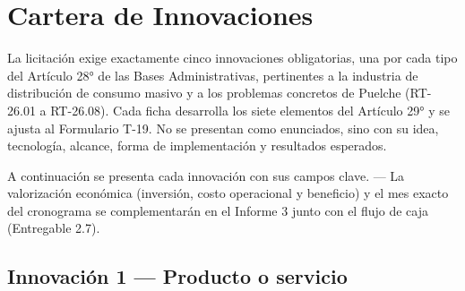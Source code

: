 \chapter{Cartera de Innovaciones}
\label{sec:innovaciones}

La licitación exige exactamente cinco innovaciones obligatorias, una por cada tipo del
Artículo 28° de las Bases Administrativas, pertinentes a la industria de distribución de
consumo masivo y a los problemas concretos de Puelche (RT-26.01 a RT-26.08). Cada ficha
desarrolla los siete elementos del Artículo 29° y se ajusta al Formulario T-19. No se
presentan como enunciados, sino con su idea, tecnología, alcance, forma de implementación
y resultados esperados.

A continuación se presenta cada innovación con sus campos clave. \pendiente{} — La
valorización económica (inversión, costo operacional y beneficio) y el mes exacto del
cronograma se complementarán en el Informe 3 junto con el flujo de caja (Entregable 2.7).

\section{Innovación 1 — Producto o servicio}

